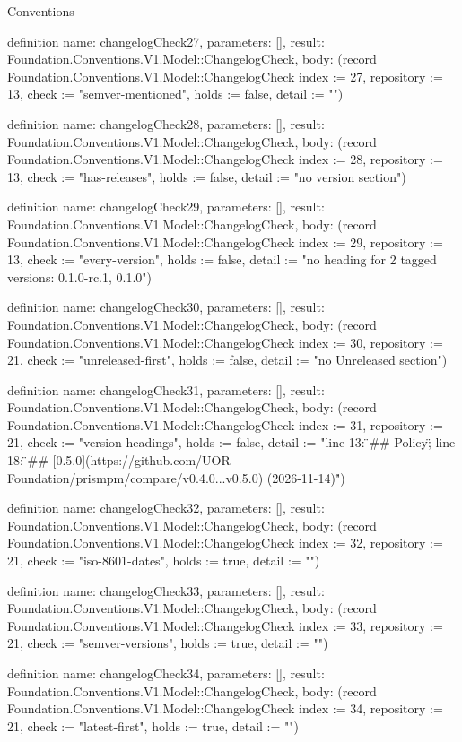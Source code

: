 \begin{lexlean}{Conventions}
\begin{semanticmodule}
definition{
  name: changelogCheck27,
  parameters: [],
  result: Foundation.Conventions.V1.Model::ChangelogCheck,
  body: (record Foundation.Conventions.V1.Model::ChangelogCheck {index := 27, repository := 13, check := "semver-mentioned", holds := false, detail := ""})
}

definition{
  name: changelogCheck28,
  parameters: [],
  result: Foundation.Conventions.V1.Model::ChangelogCheck,
  body: (record Foundation.Conventions.V1.Model::ChangelogCheck {index := 28, repository := 13, check := "has-releases", holds := false, detail := "no version section"})
}

definition{
  name: changelogCheck29,
  parameters: [],
  result: Foundation.Conventions.V1.Model::ChangelogCheck,
  body: (record Foundation.Conventions.V1.Model::ChangelogCheck {index := 29, repository := 13, check := "every-version", holds := false, detail := "no heading for 2 tagged versions: 0.1.0-rc.1, 0.1.0"})
}

definition{
  name: changelogCheck30,
  parameters: [],
  result: Foundation.Conventions.V1.Model::ChangelogCheck,
  body: (record Foundation.Conventions.V1.Model::ChangelogCheck {index := 30, repository := 21, check := "unreleased-first", holds := false, detail := "no Unreleased section"})
}

definition{
  name: changelogCheck31,
  parameters: [],
  result: Foundation.Conventions.V1.Model::ChangelogCheck,
  body: (record Foundation.Conventions.V1.Model::ChangelogCheck {index := 31, repository := 21, check := "version-headings", holds := false, detail := "line 13: \"## Policy\"; line 18: \"## [0.5.0](https://github.com/UOR-Foundation/prismpm/compare/v0.4.0...v0.5.0) (2026-11-14)\""})
}

definition{
  name: changelogCheck32,
  parameters: [],
  result: Foundation.Conventions.V1.Model::ChangelogCheck,
  body: (record Foundation.Conventions.V1.Model::ChangelogCheck {index := 32, repository := 21, check := "iso-8601-dates", holds := true, detail := ""})
}

definition{
  name: changelogCheck33,
  parameters: [],
  result: Foundation.Conventions.V1.Model::ChangelogCheck,
  body: (record Foundation.Conventions.V1.Model::ChangelogCheck {index := 33, repository := 21, check := "semver-versions", holds := true, detail := ""})
}

definition{
  name: changelogCheck34,
  parameters: [],
  result: Foundation.Conventions.V1.Model::ChangelogCheck,
  body: (record Foundation.Conventions.V1.Model::ChangelogCheck {index := 34, repository := 21, check := "latest-first", holds := true, detail := ""})
}


\end{semanticmodule}
\end{lexlean}
